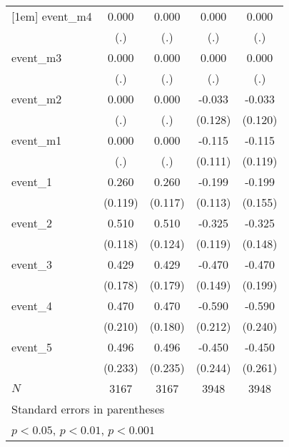 {\begin{tabular}{l*{4}{c}}
[1em]
event\_m4    &       0.000         &       0.000         &       0.000         &       0.000         \\
            &         (.)         &         (.)         &         (.)         &         (.)         \\
[1em]
event\_m3    &       0.000         &       0.000         &       0.000         &       0.000         \\
            &         (.)         &         (.)         &         (.)         &         (.)         \\
[1em]
event\_m2    &       0.000         &       0.000         &      -0.033         &      -0.033         \\
            &         (.)         &         (.)         &     (0.128)         &     (0.120)         \\
[1em]
event\_m1    &       0.000         &       0.000         &      -0.115         &      -0.115         \\
            &         (.)         &         (.)         &     (0.111)         &     (0.119)         \\
[1em]
event\_1     &       0.260\sym{*}  &       0.260\sym{*}  &      -0.199         &      -0.199         \\
            &     (0.119)         &     (0.117)         &     (0.113)         &     (0.155)         \\
[1em]
event\_2     &       0.510\sym{***}&       0.510\sym{***}&      -0.325\sym{**} &      -0.325\sym{*}  \\
            &     (0.118)         &     (0.124)         &     (0.119)         &     (0.148)         \\
[1em]
event\_3     &       0.429\sym{*}  &       0.429\sym{*}  &      -0.470\sym{**} &      -0.470\sym{*}  \\
            &     (0.178)         &     (0.179)         &     (0.149)         &     (0.199)         \\
[1em]
event\_4     &       0.470\sym{*}  &       0.470\sym{**} &      -0.590\sym{**} &      -0.590\sym{*}  \\
            &     (0.210)         &     (0.180)         &     (0.212)         &     (0.240)         \\
[1em]
event\_5     &       0.496\sym{*}  &       0.496\sym{*}  &      -0.450         &      -0.450         \\
            &     (0.233)         &     (0.235)         &     (0.244)         &     (0.261)         \\
\hline
\(N\)       &        3167         &        3167         &        3948         &        3948         \\
\hline\hline
\multicolumn{5}{l}{\footnotesize Standard errors in parentheses}\\
\multicolumn{5}{l}{\footnotesize \sym{*} \(p<0.05\), \sym{**} \(p<0.01\), \sym{***} \(p<0.001\)}\\
\end{tabular}
}
